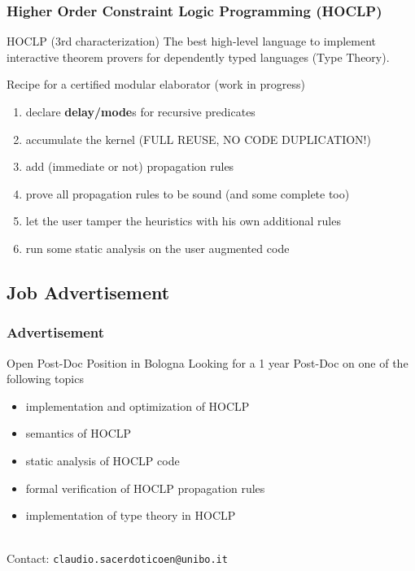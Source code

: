 \documentclass{beamer}
\begin{document}
\begin{frame}[fragile]
 \frametitle{Higher Order Constraint Logic Programming (HOCLP)}
 \begin{block}{HOCLP (3rd characterization)}
 \alert{The best} high-level language \alert{to implement interactive theorem provers}
 for dependently typed languages (Type Theory).
 \end{block}

 \begin{block}{Recipe for a certified modular elaborator (work in progress)}
  \begin{enumerate}
   \item declare \textbf{delay/mode}s for recursive predicates
   \item accumulate the kernel (\alert{FULL REUSE, NO CODE DUPLICATION}!)
   \item add (immediate or not) propagation rules
   \item prove all propagation rules to be sound (and some complete too)
   \item let the user tamper the heuristics with his own additional rules
   \item run some static analysis on the user augmented code
  \end{enumerate}
 \end{block}
\end{frame}

\subsection{Job Advertisement}

\begin{frame}
\frametitle{Advertisement}
\begin{block}{Open Post-Doc Position in Bologna}
Looking for a 1 year Post-Doc on one of the following topics
 \begin{itemize}
  \item implementation and optimization of HOCLP
  \item semantics of HOCLP
  \item static analysis of HOCLP code
  \item formal verification of HOCLP propagation rules
  \item implementation of type theory in HOCLP
 \end{itemize}

~\\\alert{Contact: \texttt{claudio.sacerdoticoen@unibo.it}}
\end{block}
\end{frame}
\end{document}
